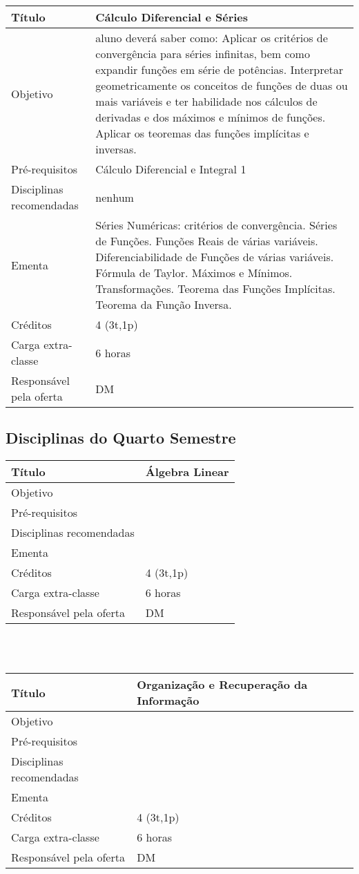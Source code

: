 \begin{tabular}{|p{4.5cm}|p{10.0cm}|} \hline
Título & Cálculo Diferencial e Séries \\ \hline
Objetivo &  aluno deverá saber como: Aplicar os critérios de convergência para séries infinitas, bem como expandir funções em série de potências. Interpretar geometricamente os conceitos de funções de duas ou mais variáveis e ter habilidade nos cálculos de derivadas e dos máximos e mínimos de funções. Aplicar os teoremas das funções implícitas e inversas. \\ \hline
Pré-requisitos & Cálculo Diferencial e Integral 1 \\ \hline
Disciplinas recomendadas & nenhum \\ \hline
Ementa & Séries Numéricas: critérios de convergência. Séries de Funções. Funções Reais de várias variáveis. Diferenciabilidade de Funções de várias variáveis. Fórmula de Taylor. Máximos e Mínimos. Transformações. Teorema das Funções Implícitas. Teorema da Função Inversa. \\ \hline
Créditos & 4 (3t,1p) \\ \hline
Carga extra-classe & 6 horas \\ \hline
Responsável pela oferta & DM \\ \hline
\end{tabular}


\subsection{Disciplinas do Quarto Semestre}

\begin{tabular}{|p{4.5cm}|p{10.0cm}|} \hline
Título & Álgebra Linear \\ \hline
Objetivo &  \\ \hline
Pré-requisitos &  \\ \hline
Disciplinas recomendadas &  \\ \hline
Ementa &  \\ \hline
Créditos & 4 (3t,1p) \\ \hline
Carga extra-classe & 6 horas \\ \hline
Responsável pela oferta & DM \\ \hline
\end{tabular}
\\
\\

\begin{tabular}{|p{4.5cm}|p{10.0cm}|} \hline
Título & Organização e Recuperação da Informação \\ \hline
Objetivo &  \\ \hline
Pré-requisitos &  \\ \hline
Disciplinas recomendadas &  \\ \hline
Ementa &  \\ \hline
Créditos & 4 (3t,1p) \\ \hline
Carga extra-classe & 6 horas \\ \hline
Responsável pela oferta & DM \\ \hline
\end{tabular}
\\
\\

